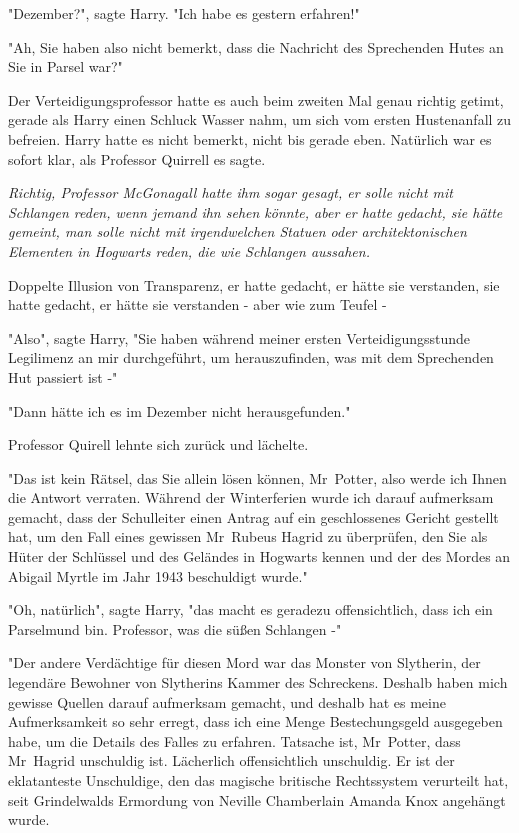 {"Dezember?", sagte Harry. "Ich habe es gestern erfahren!"

"Ah, Sie haben also nicht bemerkt, dass die Nachricht des Sprechenden Hutes an Sie in Parsel war?"

Der Verteidigungsprofessor hatte es auch beim zweiten Mal genau richtig getimt, gerade als Harry einen Schluck Wasser nahm, um sich vom ersten Hustenanfall zu befreien. Harry hatte es nicht bemerkt, nicht bis gerade eben. Natürlich war es sofort klar, als Professor Quirrell es sagte.

\emph{Richtig, Professor McGonagall hatte ihm sogar gesagt, er solle nicht mit Schlangen reden, wenn jemand ihn sehen könnte, aber er hatte gedacht, sie hätte gemeint, man solle nicht mit irgendwelchen Statuen oder architektonischen Elementen in Hogwarts reden, die wie Schlangen aussahen.}

Doppelte Illusion von Transparenz, er hatte gedacht, er hätte sie verstanden, sie hatte gedacht, er hätte sie verstanden - aber wie zum Teufel -

"Also", sagte Harry, "Sie haben während meiner ersten Verteidigungsstunde Legilimenz an mir durchgeführt, um herauszufinden, was mit dem Sprechenden Hut passiert ist -"

"Dann hätte ich es im Dezember nicht herausgefunden."

Professor Quirell lehnte sich zurück und lächelte.

"Das ist kein Rätsel, das Sie allein lösen können, Mr~Potter, also werde ich Ihnen die Antwort verraten. Während der Winterferien wurde ich darauf aufmerksam gemacht, dass der Schulleiter einen Antrag auf ein geschlossenes Gericht gestellt hat, um den Fall eines gewissen Mr~Rubeus Hagrid zu überprüfen, den Sie als Hüter der Schlüssel und des Geländes in Hogwarts kennen und der des Mordes an Abigail Myrtle im Jahr 1943 beschuldigt wurde."

"Oh, natürlich", sagte Harry, "das macht es geradezu offensichtlich, dass ich ein Parselmund bin. Professor, was die süßen Schlangen -"

"Der andere Verdächtige für diesen Mord war das Monster von Slytherin, der legendäre Bewohner von Slytherins Kammer des Schreckens. Deshalb haben mich gewisse Quellen darauf aufmerksam gemacht, und deshalb hat es meine Aufmerksamkeit so sehr erregt, dass ich eine Menge Bestechungsgeld ausgegeben habe, um die Details des Falles zu erfahren. Tatsache ist, Mr~Potter, dass Mr~Hagrid unschuldig ist. Lächerlich offensichtlich unschuldig. Er ist der eklatanteste Unschuldige, den das magische britische Rechtssystem verurteilt hat, seit Grindelwalds Ermordung von Neville Chamberlain Amanda Knox angehängt wurde.

}
